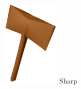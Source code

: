 \begin{frame}
\begin{columns}
\begin{column}[b]{0.22\textwidth}
\begin{center}
				\includegraphics[width=\textwidth]{./img/2_mesh/sharpAxeShaded.png}
				\small{Sharp}
			\end{center}	
		\end{column}
	\end{columns}
\end{frame}	

